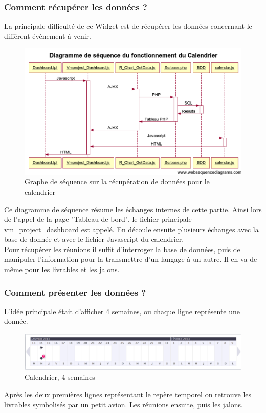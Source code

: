 \documentclass[12pt]{report}
\begin{document}
\subsubsection{Comment récupérer les données ?}
La principale difficulté de ce Widget est de récupérer les données concernant le différent évènement à venir.\\
	
\begin{figure}[H]
	\centering
	\includegraphics[width=1\textwidth]{pictures/matthieu/m_sequence.png}
	\caption{Graphe de séquence sur la récupération de données pour le calendrier}
	\label{m1}
\end{figure}
	
	Ce diagramme de séquence résume les échanges internes de cette partie. Ainsi lors de l’appel de la page "Tableau de bord", le fichier principale vm\_project\_dashboard est appelé. En découle ensuite plusieurs échanges avec la base de donnée et avec le fichier Javascript du calendrier.\\
	
Pour récupérer les réunions il suffit d’interroger la base de données, puis de manipuler l’information pour la transmettre d’un langage à un autre. Il en va de même pour les livrables et les jalons.\\
\subsubsection{Comment présenter les données ?}
L’idée principale était d’afficher 4 semaines, ou chaque ligne représente une donnée.\\
\begin{figure}[H]
	\centering
	\includegraphics[width=1\textwidth]{pictures/matthieu/m_calendar_1.png}
	\caption{Calendrier, 4 semaines}
	\label{m2}
\end{figure}
	Après les deux premières lignes représentant le repère temporel on retrouve les livrables symbolisés par un petit avion. Les réunions ensuite, puis les jalons.\\
\end{document}
